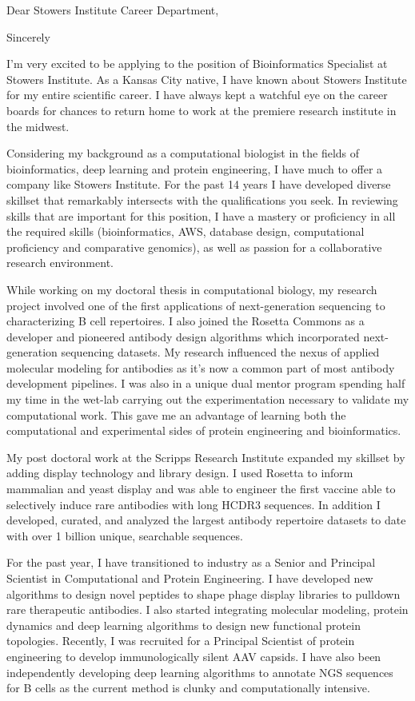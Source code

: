 \documentclass[11pt,a4paper,sans]{moderncv}        %
\title{}                               %
\newcommand{\Position}{Bioinformatics Specialist}
\newcommand{\Company}{Stowers Institute}
\newcommand{\CompanyLoc}{Kansas City}
\newcommand{\CompanyState}{MO}
\newcommand{\Personal}{As a Kansas City native, I have known about Stowers Institute for my entire scientific career. I have always kept a watchful eye on the career boards for chances to return home to work at the premiere research institute in the midwest.}
\newcommand{\skills}{bioinformatics, AWS, database design, computational proficiency and comparative genomics}
\begin{document}
\recipient{\Company{}}{\CompanyLoc \\ \CompanyLoc, \CompanyState}
\date{2020}
\opening{Dear \Company{} Career Department,}
\closing{Sincerely}
\makelettertitle
\justify
I'm very excited to be applying to the position of \Position{} at \Company. \Personal{}

Considering my background as a computational biologist in the fields of bioinformatics, deep learning and protein engineering, I have much to offer a company like \Company.
For the past 14 years I have developed diverse skillset that remarkably intersects with the qualifications you seek. In reviewing skills that are important for this position, I have a mastery or proficiency in all the required skills (\skills), as well as passion for a collaborative research environment.

While working on my doctoral thesis in computational biology, my research project involved one of the first applications of next-generation sequencing to characterizing B cell repertoires. 
I also joined the Rosetta Commons as a developer and pioneered antibody design algorithms which incorporated next-generation sequencing datasets. My research influenced the nexus of applied molecular modeling for antibodies as it's now a common part of most antibody development pipelines. I was also in a unique dual mentor program spending half my time in the wet-lab carrying out the experimentation necessary to validate my computational work. This gave me an advantage of learning both the computational and experimental sides of protein engineering and bioinformatics.

My post doctoral work at the Scripps Research Institute expanded my skillset by adding display technology and library design. I used Rosetta to inform mammalian and yeast  display and was able to engineer the first vaccine able to selectively induce rare antibodies with long HCDR3 sequences.  In addition I developed, curated, and analyzed the largest antibody repertoire datasets to date with over 1 billion unique, searchable sequences.

For the past year, I have transitioned to industry as a Senior and Principal Scientist in Computational and Protein Engineering. I have developed new algorithms to design novel peptides to shape phage display libraries to pulldown rare therapeutic antibodies. I also started integrating molecular modeling, protein dynamics and deep learning algorithms to design new functional protein topologies. Recently, I was recruited for a Principal Scientist of protein engineering to develop immunologically silent AAV capsids. I have also been independently developing deep learning algorithms to annotate NGS sequences for B cells as the current method is clunky and computationally intensive.
\end{document}
